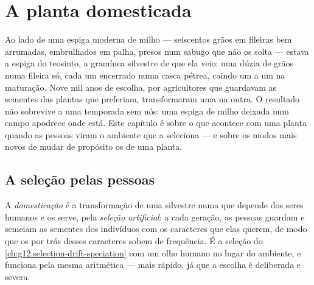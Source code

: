 \chapter{A planta domesticada}\label{ch:g12:domesticated-plants}

Ao lado de uma espiga moderna de milho --- seiscentos grãos em fileiras
bem arrumadas, embrulhados em palha, presos num sabugo que não os
solta --- estava a espiga do teosinto, a gramínea silvestre de que ela
veio: uma dúzia de grãos numa fileira só, cada um encerrado numa casca
pétrea, caindo um a um na maturação. Nove mil anos de escolha, por
agricultores que guardavam as sementes das plantas que preferiam,
transformaram uma na outra. O resultado não sobrevive a uma temporada
sem nós: uma espiga de milho deixada num campo apodrece onde está. Este
capítulo é sobre o que acontece com uma planta quando as pessoas viram
o ambiente que a seleciona --- e sobre os modos mais novos de mudar de
propósito os  de uma planta.

\section{A seleção pelas pessoas}

\begin{definition}\label{def:g12:domesticated-plants:domestication}
A \emph{domesticação} é a transformação de uma
 silvestre numa que depende dos seres humanos e os serve, pela
\emph{seleção artificial}: a cada geração, as
pessoas guardam e semeiam as sementes dos indivíduos com os caracteres
que elas querem, de modo que os  por trás desses caracteres sobem
de frequência. É a seleção do
\cref{ch:g12:selection-drift-speciation} com um olho humano no lugar do
ambiente, e funciona pela mesma aritmética --- mais rápido, já que a
escolha é deliberada e severa.
\end{definition}


